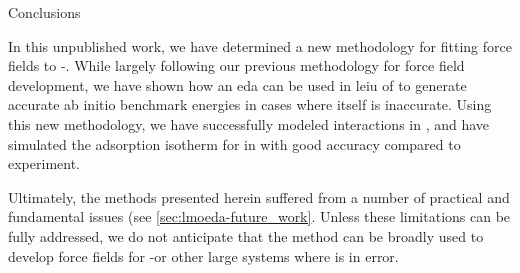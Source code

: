 \begin{section}{Conclusions}
\label{sec:lmoeda-conclusions}

In this unpublished work, we have determined a new methodology for fitting
force fields to \cus-\mofs. While largely following our previous methodology
for \mof force field development, we have shown how an \lmoeda \acrlong{eda}
can be used in leiu of \sapt to generate accurate ab initio benchmark energies
in cases where \sapt itself is inaccurate. Using this new methodology, we have
successfully modeled \co interactions in \mgmof, and have simulated the
adsorption isotherm for \co in \mgmof with good accuracy compared to
experiment.

Ultimately, the methods presented herein suffered from a number of practical
and fundamental issues (see \cref{sec:lmoeda-future_work}. Unless these
limitations can be fully addressed, we do not anticipate that the \lmoeda
method can be broadly used to develop force fields for \cus-\mofs or other
large systems where \sapt is in error.

\end{section}
